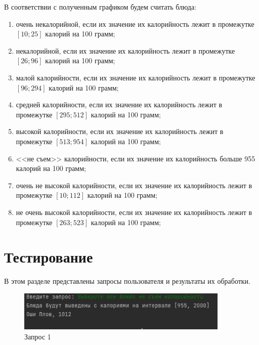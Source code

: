 В соответствии с полученным графиком будем считать блюда:
\begin{enumerate}
	\item очень некалорийной, если их значение их калорийность лежит в промежутке $[10; 25]$ калорий на 100 грамм;
	\item некалорийной, если их значение их калорийность лежит в промежутке $[26; 96]$ калорий на 100 грамм;
	\item малой калорийности, если их значение их калорийность лежит в промежутке $[96; 294]$ калорий на 100 грамм;
	\item средней калорийности, если их значение их калорийность лежит в промежутке $[295; 512]$ калорий на 100 грамм;
	\item высокой калорийности, если их значение их калорийность лежит в промежутке $[513; 954]$ калорий на 100 грамм;
	\item <<не съем>> калорийности, если их значение их калорийность больше 955 калорий на 100 грамм;
	\item очень не высокой калорийности, если их значение их калорийность лежит в промежутке $[10; 112]$ калорий на 100 грамм;
	\item не очень высокой калорийности, если их значение их калорийность лежит в промежутке $[263; 523]$ калорий на 100 грамм;
\end{enumerate}

\section{Тестирование}
В этом разделе представлены запросы пользователя и результаты их обработки.

\begin{figure}[h]
	\centering
	\includegraphics[width=0.9\textwidth]{img/request-1.png}
	\caption{Запрос 1}
	\label{fig:r1}
\end{figure}

